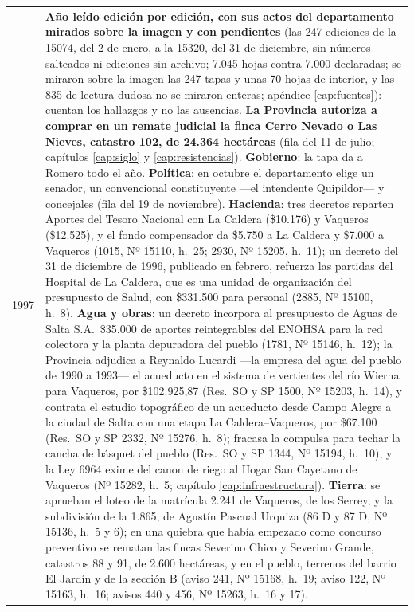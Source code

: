 \begin{longtable}{@{}p{2.7cm}p{10.3cm}@{}}
1997 & \textbf{Año leído edición por edición, con sus actos del departamento mirados sobre la imagen y con pendientes} (las 247 ediciones de la 15074, del 2 de enero, a la 15320, del 31 de diciembre, sin números salteados ni ediciones sin archivo; 7.045 hojas contra 7.000 declaradas; se miraron sobre la imagen las 247 tapas y unas 70 hojas de interior, y las 835 de lectura dudosa no se miraron enteras; apéndice \ref{cap:fuentes}): cuentan los hallazgos y no las ausencias. \textbf{La Provincia autoriza a comprar en un remate judicial la finca Cerro Nevado o Las Nieves, catastro 102, de 24.364 hectáreas} (fila del 11 de julio; capítulos \ref{cap:siglo} y \ref{cap:resistencias}). \textbf{Gobierno}: la tapa da a Romero todo el año. \textbf{Política}: en octubre el departamento elige un senador, un convencional constituyente ---el intendente Quipildor--- y concejales (fila del 19 de noviembre). \textbf{Hacienda}: tres decretos reparten Aportes del Tesoro Nacional con La Caldera (\$10.176) y Vaqueros (\$12.525), y el fondo compensador da \$5.750 a La Caldera y \$7.000 a Vaqueros (1015, Nº 15110, h.\ 25; 2930, Nº 15205, h.\ 11); un decreto del 31 de diciembre de 1996, publicado en febrero, refuerza las partidas del Hospital de La Caldera, que es una unidad de organización del presupuesto de Salud, con \$331.500 para personal (2885, Nº 15100, h.\ 8). \textbf{Agua y obras}: un decreto incorpora al presupuesto de Aguas de Salta S.A.\ \$35.000 de aportes reintegrables del ENOHSA para la red colectora y la planta depuradora del pueblo (1781, Nº 15146, h.\ 12); la Provincia adjudica a Reynaldo Lucardi ---la empresa del agua del pueblo de 1990 a 1993--- el acueducto en el sistema de vertientes del río Wierna para Vaqueros, por \$102.925,87 (Res.\ SO y SP 1500, Nº 15203, h.\ 14), y contrata el estudio topográfico de un acueducto desde Campo Alegre a la ciudad de Salta con una etapa La Caldera--Vaqueros, por \$67.100 (Res.\ SO y SP 2332, Nº 15276, h.\ 8); fracasa la compulsa para techar la cancha de básquet del pueblo (Res.\ SO y SP 1344, Nº 15194, h.\ 10), y la Ley 6964 exime del canon de riego al Hogar San Cayetano de Vaqueros (Nº 15282, h.\ 5; capítulo \ref{cap:infraestructura}). \textbf{Tierra}: se aprueban el loteo de la matrícula 2.241 de Vaqueros, de los Serrey, y la subdivisión de la 1.865, de Agustín Pascual Urquiza (86 D y 87 D, Nº 15136, h.\ 5 y 6); en una quiebra que había empezado como concurso preventivo se rematan las fincas Severino Chico y Severino Grande, catastros 88 y 91, de 2.600 hectáreas, y en el pueblo, terrenos del barrio El Jardín y de la sección B (aviso 241, Nº 15168, h.\ 19; aviso 122, Nº 15163, h.\ 16; avisos 440 y 456, Nº 15263, h.\ 16 y 17). \\

\end{longtable}
